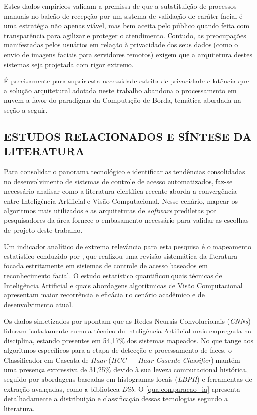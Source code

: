 Estes dados empíricos validam a premissa de que a substituição de processos manuais no balcão de recepção por um sistema de validação de caráter facial é uma estratégia não apenas viável, mas bem aceita pelo público quando feita com transparência para agilizar e proteger o atendimento. Contudo, as preocupações manifestadas pelos usuários em relação à privacidade dos seus dados (como o envio de imagens faciais para servidores remotos) exigem que a arquitetura destes sistemas seja projetada com rigor extremo.

É precisamente para suprir esta necessidade estrita de privacidade e latência que a solução arquitetural adotada neste trabalho abandona o processamento em nuvem a favor do paradigma da Computação de Borda, temática abordada na seção a seguir.

\subsection{ESTUDOS RELACIONADOS E SÍNTESE DA LITERATURA}
\label{subsec:estudos-relacionados}

Para consolidar o panorama tecnológico e identificar as tendências consolidadas no desenvolvimento de sistemas de controle de acesso automatizados, faz-se necessário analisar como a literatura científica recente aborda a convergência entre Inteligência Artificial e Visão Computacional. Nesse cenário, mapear os algoritmos mais utilizados e as arquiteturas de \textit{software} prediletas por pesquisadores da área fornece o embasamento necessário para validar as escolhas de projeto deste trabalho.

Um indicador analítico de extrema relevância para esta pesquisa é o mapeamento estatístico conduzido por , que realizou uma revisão sistemática da literatura focada estritamente em sistemas de controle de acesso baseados em reconhecimento facial. O estudo estatístico quantificou quais técnicas de Inteligência Artificial e quais abordagens algorítmicas de Visão Computacional apresentam maior recorrência e eficácia no cenário acadêmico e de desenvolvimento atual.

Os dados sintetizados por  apontam que as Redes Neurais Convolucionais (\textit{CNNs}) lideram isoladamente como a técnica de Inteligência Artificial mais empregada na disciplina, estando presentes em 54,17\% dos sistemas mapeados. No que tange aos algoritmos específicos para a etapa de detecção e processamento de faces, o Classificador em Cascata de \textit{Haar} (\textit{HCC — Haar Cascade Classifier}) mantém uma presença expressiva de 31,25\% devido à sua leveza computacional histórica, seguido por abordagens baseadas em histogramas locais (\textit{LBPH}) e ferramentas de extração avançadas, como a biblioteca \textit{Dlib}. O \autoref{qua:comparacao_ia} apresenta detalhadamente a distribuição e classificação dessas tecnologias segundo a literatura.

